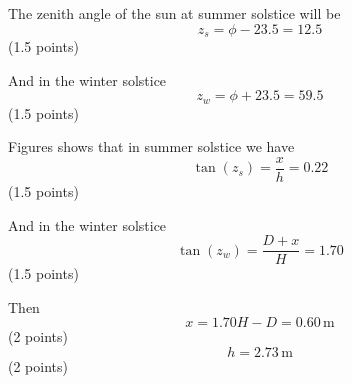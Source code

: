The zenith angle of the sun at summer solstice will be
\[
  z_s = \phi - 23.5 = 12.5
\]
\hfill(1.5 points)

And in the winter solstice
\[
  z_w = \phi + 23.5 = 59.5
\]
\hfill(1.5 points)

Figures shows that in summer solstice we have
\[
  \tan(z_s) = \frac{x}{h} = 0.22
\]
\hfill(1.5 points)

And in the winter solstice
\[
  \tan(z_w) = \frac{D + x}{H} = 1.70
\]
\hfill(1.5 points)

Then
\[
  x = 1.70H - D = 0.60\,\mathrm{m}
\]
\hfill(2 points)
\[
  h = 2.73\,\mathrm{m}
\]
\hfill(2 points)

